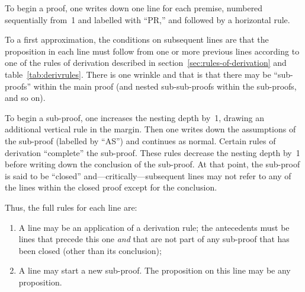 \documentclass{article}
\begin{document}
To begin a proof, one writes down one line for each premise, numbered
sequentially from~1 and labelled with ``PR,'' and followed by a
horizontal rule.

To a first approximation, the conditions on subsequent lines are that
the proposition in each line must follow from one or more previous lines
according to one of the rules of derivation described in
section~\ref{sec:rules-of-derivation} and table~\ref{tab:derivrules}.
There is one wrinkle and that is that there may be ``sub-proofs'' within
the main proof (and nested sub-sub-proofs within the sub-proofs, and so
on).

To begin a sub-proof, one increases the nesting depth by~1, drawing an
additional vertical rule in the margin.  Then one writes down the
assumptions of the sub-proof (labelled by ``AS'') and continues as
normal. Certain rules of derivation ``complete'' the sub-proof. These
rules decrease the nesting depth by~1 before writing down the conclusion
of the sub-proof.  At that point, the sub-proof is said to be ``closed''
and---critically---subsequent lines may not refer to any of the lines
within the closed proof except for the conclusion.

Thus, the full rules for each line are:
\begin{enumerate}
\item A line may be an application of a derivation rule; the antecedents
  must be lines that precede this one \emph{and} that are not part of
  any sub-proof that has been closed (other than its conclusion);
\item A line may start a new sub-proof.  The proposition on this line
  may be any proposition.
\end{enumerate}
\end{document}
